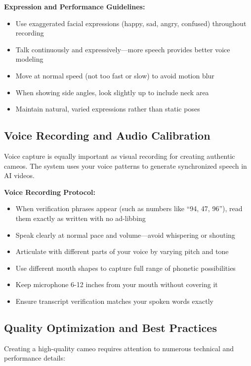 \textbf{Expression and Performance Guidelines:}
\begin{itemize}
\item Use exaggerated facial expressions (happy, sad, angry, confused) throughout recording
\item Talk continuously and expressively—more speech provides better voice modeling
\item Move at normal speed (not too fast or slow) to avoid motion blur
\item When showing side angles, look slightly up to include neck area
\item Maintain natural, varied expressions rather than static poses
\end{itemize}

\subsection{Voice Recording and Audio Calibration}

Voice capture is equally important as visual recording for creating authentic cameos. The system uses your voice patterns to generate synchronized speech in AI videos.

\textbf{Voice Recording Protocol:}
\begin{itemize}
\item When verification phrases appear (such as numbers like ``94, 47, 96''), read them exactly as written with no ad-libbing
\item Speak clearly at normal pace and volume—avoid whispering or shouting
\item Articulate with different parts of your voice by varying pitch and tone
\item Use different mouth shapes to capture full range of phonetic possibilities
\item Keep microphone 6-12 inches from your mouth without covering it
\item Ensure transcript verification matches your spoken words exactly
\end{itemize}

\subsection{Quality Optimization and Best Practices}

Creating a high-quality cameo requires attention to numerous technical and performance details:

